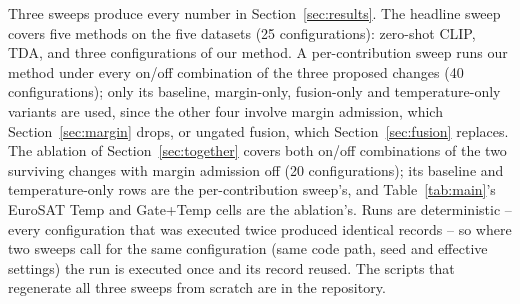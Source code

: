 Three sweeps produce every number in Section~\ref{sec:results}. The headline sweep covers
five methods on the five datasets (25 configurations): zero-shot CLIP, TDA, and three
configurations of our method. A per-contribution sweep runs our method under every on/off
combination of the three proposed changes (40 configurations); only its baseline, margin-only,
fusion-only and temperature-only variants are used, since the other four involve margin
admission, which Section~\ref{sec:margin} drops, or ungated fusion, which
Section~\ref{sec:fusion} replaces. The ablation of Section~\ref{sec:together} covers both
on/off combinations of the two surviving changes with margin admission off (20
configurations); its baseline and temperature-only rows are the per-contribution sweep's, and
Table~\ref{tab:main}'s EuroSAT Temp and Gate+Temp cells are the ablation's.
Runs are deterministic -- every configuration that was executed twice produced identical
records -- so where two sweeps call for the same configuration (same code path, seed and
effective settings) the run is executed once and its record reused. The scripts that
regenerate all three sweeps from scratch are in the repository.
